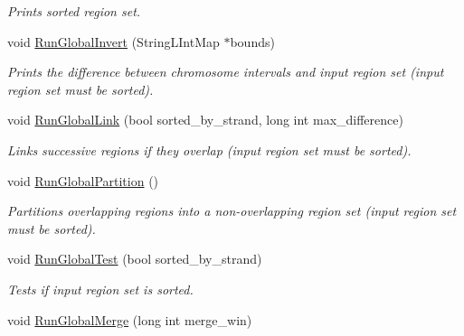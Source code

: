 \begin{CompactItemize}
\begin{CompactList}\small\item\em Prints sorted region set. \item\end{CompactList}\item 
\hypertarget{classGenomicRegionSet_1056659ccda2e39febb6b87d858a88c4}{
void \hyperlink{classGenomicRegionSet_1056659ccda2e39febb6b87d858a88c4}{RunGlobalInvert} (StringLIntMap $\ast$bounds)}
\label{classGenomicRegionSet_1056659ccda2e39febb6b87d858a88c4}

\begin{CompactList}\small\item\em Prints the difference between chromosome intervals and input region set (input region set must be sorted). \item\end{CompactList}\item 
\hypertarget{classGenomicRegionSet_b9783fb4fead289c7fe107f9bec1865b}{
void \hyperlink{classGenomicRegionSet_b9783fb4fead289c7fe107f9bec1865b}{RunGlobalLink} (bool sorted\_\-by\_\-strand, long int max\_\-difference)}
\label{classGenomicRegionSet_b9783fb4fead289c7fe107f9bec1865b}

\begin{CompactList}\small\item\em Links successive regions if they overlap (input region set must be sorted). \item\end{CompactList}\item 
\hypertarget{classGenomicRegionSet_40dd79548f9d0333f1169bd17a6e9465}{
void \hyperlink{classGenomicRegionSet_40dd79548f9d0333f1169bd17a6e9465}{RunGlobalPartition} ()}
\label{classGenomicRegionSet_40dd79548f9d0333f1169bd17a6e9465}

\begin{CompactList}\small\item\em Partitions overlapping regions into a non-overlapping region set (input region set must be sorted). \item\end{CompactList}\item 
\hypertarget{classGenomicRegionSet_83853c6af4b779a37de284751d09348d}{
void \hyperlink{classGenomicRegionSet_83853c6af4b779a37de284751d09348d}{RunGlobalTest} (bool sorted\_\-by\_\-strand)}
\label{classGenomicRegionSet_83853c6af4b779a37de284751d09348d}

\begin{CompactList}\small\item\em Tests if input region set is sorted. \item\end{CompactList}\item 
\hypertarget{classGenomicRegionSet_53885e10c5dc9aa51ebece77dae63313}{
void \hyperlink{classGenomicRegionSet_53885e10c5dc9aa51ebece77dae63313}{RunGlobalMerge} (long int merge\_\-win)}
\label{classGenomicRegionSet_53885e10c5dc9aa51ebece77dae63313}


\end{CompactItemize}
